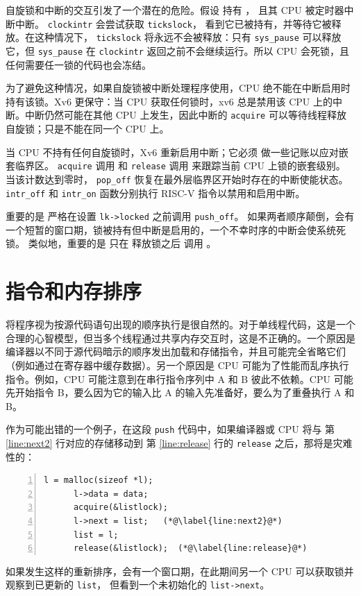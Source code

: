 自旋锁和中断的交互引发了一个潜在的危险。假设
持有
，
且其 CPU 被定时器中断中断。
\lstinline{clockintr}
会尝试获取
\lstinline{tickslock}，
看到它已被持有，并等待它被释放。在这种情况下，
\lstinline{tickslock}
将永远不会被释放：只有
\lstinline{sys_pause}
可以释放它，但
\lstinline{sys_pause}
在
\lstinline{clockintr}
返回之前不会继续运行。所以 CPU 会死锁，且任何需要任一锁的代码也会冻结。

为了避免这种情况，如果自旋锁被中断处理程序使用，CPU 绝不能在中断启用时持有该锁。Xv6 更保守：当 CPU 获取任何锁时，xv6 总是禁用该 CPU 上的中断。中断仍然可能在其他 CPU 上发生，因此中断的
\lstinline{acquire}
可以等待线程释放自旋锁；只是不能在同一个 CPU 上。

当 CPU 不持有任何自旋锁时，Xv6 重新启用中断；它必须
做一些记账以应对嵌套临界区。
\lstinline{acquire}
调用
和
\lstinline{release}
调用
来跟踪当前 CPU 上锁的嵌套级别。
当该计数达到零时，
\lstinline{pop_off}
恢复在最外层临界区开始时存在的中断使能状态。
\lstinline{intr_off}
和
\lstinline{intr_on}
函数分别执行 RISC-V 指令以禁用和启用中断。

重要的是
严格在设置
\lstinline{lk->locked}
之前调用
\lstinline{push_off}。
如果两者顺序颠倒，会有一个短暂的窗口期，锁被持有但中断是启用的，一个不幸时序的中断会使系统死锁。
类似地，重要的是
只在
释放锁之后
调用
。

\section{指令和内存排序}

将程序视为按源代码语句出现的顺序执行是很自然的。对于单线程代码，这是一个合理的心智模型，但当多个线程通过共享内存交互时，这是不正确的。一个原因是编译器以不同于源代码暗示的顺序发出加载和存储指令，并且可能完全省略它们（例如通过在寄存器中缓存数据）。另一个原因是 CPU 可能为了性能而乱序执行指令。例如，CPU 可能注意到在串行指令序列中 A 和 B 彼此不依赖。CPU 可能先开始指令 B，要么因为它的输入比 A 的输入先准备好，要么为了重叠执行 A 和 B。

作为可能出错的一个例子，在这段
\lstinline{push}
代码中，如果编译器或 CPU 将与
第 \ref{line:next2} 行对应的存储移动到
第 \ref{line:release} 行的
\lstinline{release}
之后，那将是灾难性的：
\begin{lstlisting}[numbers=left,firstnumber=1]
      l = malloc(sizeof *l);
      l->data = data;
      acquire(&listlock);
      l->next = list;   (*@\label{line:next2}@*)
      list = l;      
      release(&listlock);  (*@\label{line:release}@*)
\end{lstlisting}
如果发生这样的重新排序，会有一个窗口期，在此期间另一个 CPU 可以获取锁并观察到已更新的
\lstinline{list}，
但看到一个未初始化的
\lstinline{list->next}。

